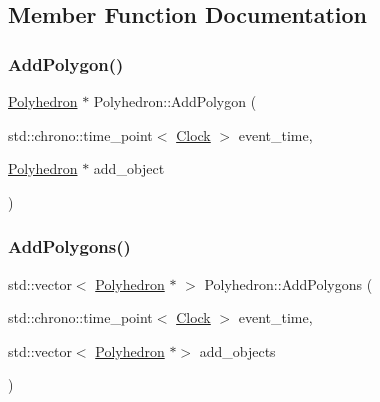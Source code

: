 \subsection{Member Function Documentation}
\mbox{\label{classPolyhedron_a63bc509a87935cc25e541d2490c01d1f}} 
\subsubsection{\texorpdfstring{Add\+Polygon()}{AddPolygon()}}
{\footnotesize\ttfamily \mbox{\hyperlink{classPolyhedron}{Polyhedron}} $\ast$ Polyhedron\+::\+Add\+Polygon (\begin{DoxyParamCaption}\item[{std\+::chrono\+::time\+\_\+point$<$ \mbox{\hyperlink{universe_8h_a0ef8d951d1ca5ab3cfaf7ab4c7a6fd80}{Clock}} $>$}]{event\+\_\+time,  }\item[{\mbox{\hyperlink{classPolyhedron}{Polyhedron}} $\ast$}]{add\+\_\+object }\end{DoxyParamCaption})}

\mbox{\label{classPolyhedron_a9564a286e7323b56667971b851f0674a}} 
\subsubsection{\texorpdfstring{Add\+Polygons()}{AddPolygons()}}
{\footnotesize\ttfamily std\+::vector$<$ \mbox{\hyperlink{classPolyhedron}{Polyhedron}} $\ast$ $>$ Polyhedron\+::\+Add\+Polygons (\begin{DoxyParamCaption}\item[{std\+::chrono\+::time\+\_\+point$<$ \mbox{\hyperlink{universe_8h_a0ef8d951d1ca5ab3cfaf7ab4c7a6fd80}{Clock}} $>$}]{event\+\_\+time,  }\item[{std\+::vector$<$ \mbox{\hyperlink{classPolyhedron}{Polyhedron}} $\ast$$>$}]{add\+\_\+objects }\end{DoxyParamCaption})}

\mbox{\label{classPolyhedron_abfacad3a348785dab8819e70bf92d8d1}} 
